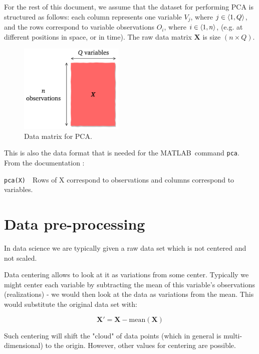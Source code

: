\documentclass[10pt,twocolumn]{article}
\begin{document}
For the rest of this document, we assume that the dataset for performing PCA is structured as follows: each column represents one variable $V_j$, where $j \in \braket{1, Q}$, and the rows correspond to variable observations $O_i$, where $i \in \braket{1, n}$, (e.g. at different positions in space, or in time). The raw data matrix $\bm{X}$ is size $(n \times Q)$.

\begin{figure}[H]
\centering\includegraphics[width=5cm]{data-set-PCA.png}
\caption{Data matrix for PCA.}
\label{fig:data-matrix}
\end{figure}

This is also the data format that is needed for the MATLAB\textregistered \, command \texttt{pca}. From the documentation \cite{Matlab-pca}:


\begin{framed}
\texttt{pca(X)}
\,\,
Rows of X correspond to observations and columns correspond to variables.
\end{framed}

\section{Data pre-processing}

In data science we are typically given a raw data set which is not centered and not scaled. 

Data centering allows to look at it as variations from some center. Typically we might center each variable by subtracting the mean of this variable's observations (realizations) - we would then look at the data as variations from the mean. This would substitute the original data set with:

\begin{equation}
\bm{X'} = \bm{X} - \text{mean}(\bm{X})
\end{equation}

Such centering will shift the "cloud" of data points (which in general is multi-dimensional) to the origin. However, other values for centering are possible.
\end{document}
